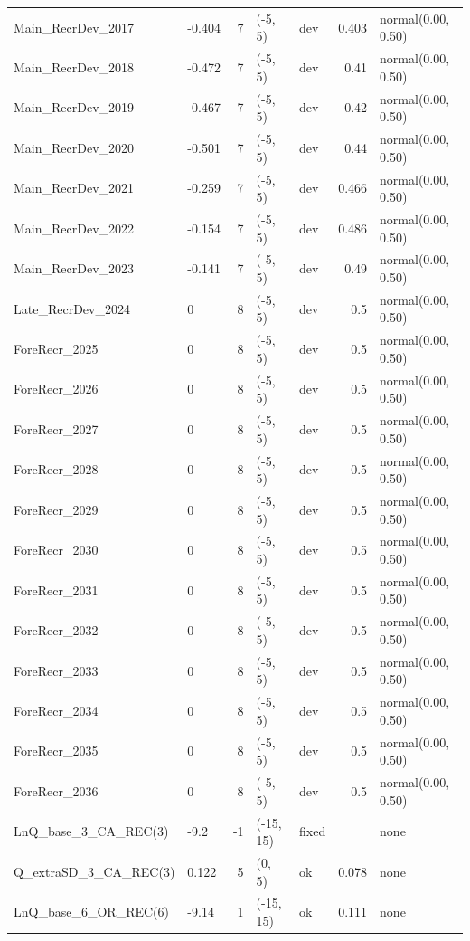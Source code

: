 \documentclass[
]{scrartcl}
\begin{document}
\begin{landscape}
\begin{longtable}{llrllrl}
Main\_RecrDev\_2017 & -0.404 & 7 & (-5, 5) & dev & 0.403 & normal(0.00, 0.50) \\ 
Main\_RecrDev\_2018 & -0.472 & 7 & (-5, 5) & dev & 0.41 & normal(0.00, 0.50) \\ 
Main\_RecrDev\_2019 & -0.467 & 7 & (-5, 5) & dev & 0.42 & normal(0.00, 0.50) \\ 
Main\_RecrDev\_2020 & -0.501 & 7 & (-5, 5) & dev & 0.44 & normal(0.00, 0.50) \\ 
Main\_RecrDev\_2021 & -0.259 & 7 & (-5, 5) & dev & 0.466 & normal(0.00, 0.50) \\ 
Main\_RecrDev\_2022 & -0.154 & 7 & (-5, 5) & dev & 0.486 & normal(0.00, 0.50) \\ 
Main\_RecrDev\_2023 & -0.141 & 7 & (-5, 5) & dev & 0.49 & normal(0.00, 0.50) \\ 
Late\_RecrDev\_2024 & 0 & 8 & (-5, 5) & dev & 0.5 & normal(0.00, 0.50) \\ 
ForeRecr\_2025 & 0 & 8 & (-5, 5) & dev & 0.5 & normal(0.00, 0.50) \\ 
ForeRecr\_2026 & 0 & 8 & (-5, 5) & dev & 0.5 & normal(0.00, 0.50) \\ 
ForeRecr\_2027 & 0 & 8 & (-5, 5) & dev & 0.5 & normal(0.00, 0.50) \\ 
ForeRecr\_2028 & 0 & 8 & (-5, 5) & dev & 0.5 & normal(0.00, 0.50) \\ 
ForeRecr\_2029 & 0 & 8 & (-5, 5) & dev & 0.5 & normal(0.00, 0.50) \\ 
ForeRecr\_2030 & 0 & 8 & (-5, 5) & dev & 0.5 & normal(0.00, 0.50) \\ 
ForeRecr\_2031 & 0 & 8 & (-5, 5) & dev & 0.5 & normal(0.00, 0.50) \\ 
ForeRecr\_2032 & 0 & 8 & (-5, 5) & dev & 0.5 & normal(0.00, 0.50) \\ 
ForeRecr\_2033 & 0 & 8 & (-5, 5) & dev & 0.5 & normal(0.00, 0.50) \\ 
ForeRecr\_2034 & 0 & 8 & (-5, 5) & dev & 0.5 & normal(0.00, 0.50) \\ 
ForeRecr\_2035 & 0 & 8 & (-5, 5) & dev & 0.5 & normal(0.00, 0.50) \\ 
ForeRecr\_2036 & 0 & 8 & (-5, 5) & dev & 0.5 & normal(0.00, 0.50) \\ 
LnQ\_base\_3\_CA\_REC(3) & -9.2 & -1 & (-15, 15) & fixed &  & none \\ 
Q\_extraSD\_3\_CA\_REC(3) & 0.122 & 5 & (0, 5) & ok & 0.078 & none \\ 
LnQ\_base\_6\_OR\_REC(6) & -9.14 & 1 & (-15, 15) & ok & 0.111 & none \\ 

\end{longtable}
\end{landscape}
\end{document}
